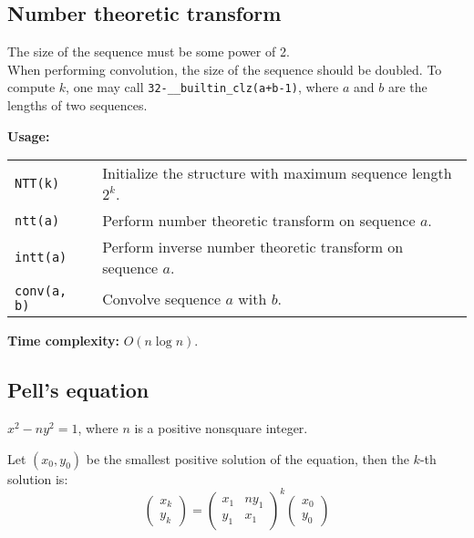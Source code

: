 \subsection{Number theoretic transform}
\Warning The size of the sequence must be some power of 2. \\
\Warning When performing convolution, the size of the sequence should be doubled. To compute $k$, one may call \lstinline|32-__builtin_clz(a+b-1)|, where $a$ and $b$ are the lengths of two sequences.  \par
\textbf{Usage:} \\[0.1cm]
\begin{tabular}{p{2cm} p{9.5cm}}
  \lstinline|NTT(k)| & Initialize the structure with maximum sequence length $2^k$. \\
  \lstinline|ntt(a)| & Perform number theoretic transform on sequence $a$.  \\
  \lstinline|intt(a)| & Perform inverse number theoretic transform on sequence $a$. \\
  \lstinline|conv(a, b)| & Convolve sequence $a$ with $b$. \\
\end{tabular} \par
\textbf{Time complexity:} $O(n \log n)$. \par


\subsection{Pell's equation}
$x^2 - ny^2 = 1$, where $n$ is a positive nonsquare integer. \par
Let $(x_0, y_0)$ be the smallest positive solution of the equation, then the $k$-th solution is:
$$\begin{pmatrix}x_k \\ y_k\end{pmatrix} =
\begin{pmatrix}
  x_1 & ny_1 \\
  y_1 & x_1
\end{pmatrix} ^k
\begin{pmatrix}x_0 \\ y_0\end{pmatrix}$$



